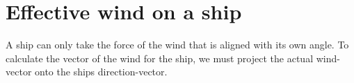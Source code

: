 
\section{Effective wind on a ship}
A ship can only take the force of the wind that is aligned with its own angle. To calculate the vector of the wind for the ship, we must project the actual wind-vector onto the ships direction-vector. 
